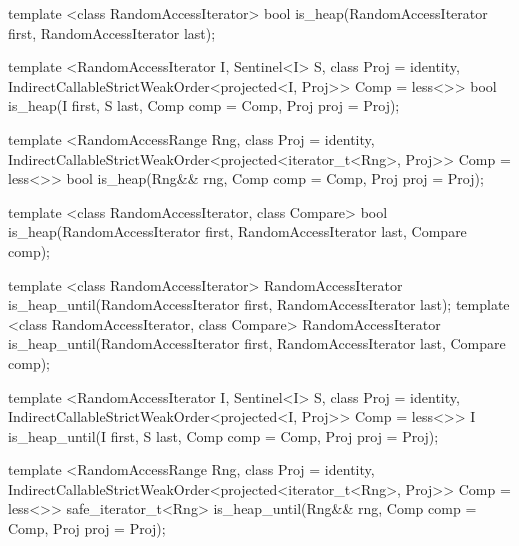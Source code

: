%
\begin{removedblock}
\begin{itemdecl}
  template <class RandomAccessIterator>
    bool is_heap(RandomAccessIterator first, RandomAccessIterator last);
\end{itemdecl}
\end{removedblock}
\begin{addedblock}
\begin{itemdecl}
template <RandomAccessIterator I, Sentinel<I> S, class Proj = identity,
    IndirectCallableStrictWeakOrder<projected<I, Proj>> Comp = less<>>
  bool is_heap(I first, S last, Comp comp = Comp{}, Proj proj = Proj{});

template <RandomAccessRange Rng, class Proj = identity,
    IndirectCallableStrictWeakOrder<projected<iterator_t<Rng>, Proj>> Comp = less<>>
  bool
    is_heap(Rng&& rng, Comp comp = Comp{}, Proj proj = Proj{});
\end{itemdecl}
\end{addedblock}

\begin{itemdescr}
\pnum
\returns {}
\end{itemdescr}

\begin{removedblock}
%
\begin{itemdecl}
  template <class RandomAccessIterator, class Compare>
    bool is_heap(RandomAccessIterator first, RandomAccessIterator last, Compare comp);
\end{itemdecl}

\begin{itemdescr}
\pnum
\returns {}
\end{itemdescr}
\end{removedblock}

%
\begin{removedblock}
\begin{itemdecl}
  template <class RandomAccessIterator>
    RandomAccessIterator is_heap_until(RandomAccessIterator first, RandomAccessIterator last);
  template <class RandomAccessIterator, class Compare>
    RandomAccessIterator is_heap_until(RandomAccessIterator first, RandomAccessIterator last,
      Compare comp);
\end{itemdecl}
\end{removedblock}
\begin{addedblock}
\begin{itemdecl}
template <RandomAccessIterator I, Sentinel<I> S, class Proj = identity,
    IndirectCallableStrictWeakOrder<projected<I, Proj>> Comp = less<>>
  I is_heap_until(I first, S last, Comp comp = Comp{}, Proj proj = Proj{});

template <RandomAccessRange Rng, class Proj = identity,
    IndirectCallableStrictWeakOrder<projected<iterator_t<Rng>, Proj>> Comp = less<>>
  safe_iterator_t<Rng>
    is_heap_until(Rng&& rng, Comp comp = Comp{}, Proj proj = Proj{});
\end{itemdecl}
\end{addedblock}

